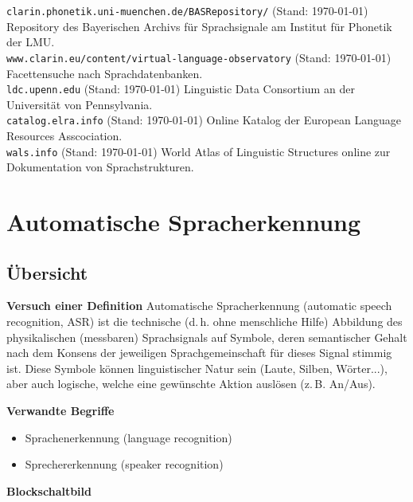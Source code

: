 \documentclass[11pt]{book}
\newcommand{\begi}{\begin{itemize} \setlength{\itemsep}{0.2cm}}
\newcommand{\ndit}{\end{itemize}}
\begin{document}
\label{link_clarin_repository}
{\tt clarin.phonetik.uni-muenchen.de/BASRepository/} (Stand: \today) Repository des Bayerischen Archivs für Sprachsignale am Institut für Phonetik der LMU.\newline\\
{\tt www.clarin.eu/content/virtual-language-observatory} (Stand: \today) Facettensuche nach Sprachdatenbanken.\newline\\
{\tt ldc.upenn.edu} (Stand: \today) Linguistic Data Consortium an der Universität von Pennsylvania.\newline\\
{\tt catalog.elra.info} (Stand: \today) Online Katalog der European Language Resources Asscociation.\newline\\
{\tt wals.info} (Stand: \today) World Atlas of Linguistic Structures online zur Dokumentation von Sprachstrukturen.








\chapter{Automatische Spracherkennung}

\section{Übersicht}

{\bf Versuch einer Definition}
Automatische Spracherkennung (automatic speech recognition, ASR) 
ist die technische (d.\,h. ohne menschliche 
Hilfe) Abbildung des physikalischen 
(messbaren) Sprachsignals auf Symbole, deren semantischer Gehalt nach 
dem Konsens der jeweiligen Sprachgemeinschaft f\"ur dieses Signal 
stimmig ist. Diese Symbole
k\"onnen linguistischer Natur sein (Laute, Silben, W\"orter...), 
aber auch logische, welche eine gew\"unschte 
Aktion ausl\"osen (z.\,B. An/Aus).

{\bf Verwandte Begriffe}
\begi
\item Sprachenerkennung (language recognition)
\item Sprechererkennung (speaker recognition)
\ndit

{\bf Blockschaltbild}
\end{document}
